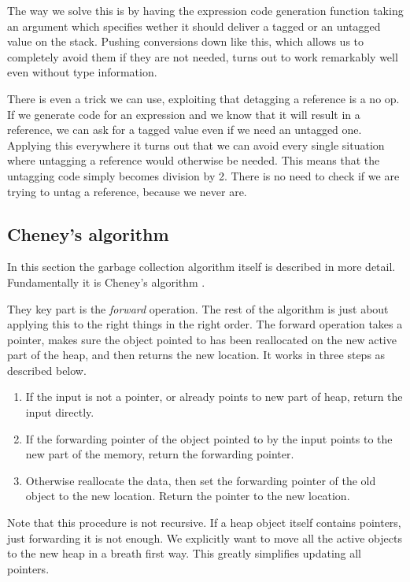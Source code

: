 \documentclass{scrartcl}
\begin{document}
The way we solve this is by having the expression code generation
function taking an argument which specifies wether it should deliver
a tagged or an untagged value on the stack. Pushing conversions down
like this, which allows us to completely avoid them if they are not
needed, turns out to work remarkably well even without type
information.

There is even a trick we can use, exploiting that detagging a reference
is a no op. If we generate code for an expression and we know that it
will result in a reference, we can ask for a tagged value even if we
need an untagged one. Applying this everywhere it turns out that we
can avoid every single situation where untagging a reference would
otherwise be needed. This means that the untagging code simply becomes
division by 2. There is no need to check if we are trying to untag a
reference, because we never are.

\subsection{Cheney's algorithm}

In this section the garbage collection algorithm itself is described
in more detail. Fundamentally it is Cheney's algorithm \cite{cheney}.

They key part is the \emph{forward} operation. The rest of the algorithm
is just about applying this to the right things in the right order.
The forward operation takes a pointer, makes sure the object pointed
to has been reallocated on the new active part of the heap, and then
returns the new location. It works in three steps as described below.

\begin{enumerate}
\item If the input is not a pointer, or already points to new part of
 heap, return the input directly.
\item If the forwarding pointer of the object pointed to by the input
 points to the new part of the memory, return the forwarding pointer.
\item Otherwise reallocate the data, then set the forwarding pointer of
 the old object to the new location. Return the pointer to the new location.
\end{enumerate}

Note that this procedure is not recursive. If a heap object itself
contains pointers, just forwarding it is not enough. We explicitly
want to move all the active objects to the new heap in a breath first
way. This greatly simplifies updating all pointers.
\end{document}

